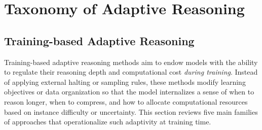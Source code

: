 \documentclass[11pt]{article}
\begin{document}
\section{Taxonomy of Adaptive Reasoning}

\label{sec:taxonomy}

\subsection{Training-based Adaptive Reasoning}
\label{sec:training-based}

Training-based adaptive reasoning methods aim to endow models with the ability to regulate their reasoning depth and computational cost \emph{during training}.
Instead of applying external halting or sampling rules, these methods modify learning objectives or data organization so that the model internalizes
a sense of when to reason longer, when to compress, and how to allocate computational resources based on instance difficulty or uncertainty.
This section reviews five main families of approaches that operationalize such adaptivity at training time.
\end{document}
